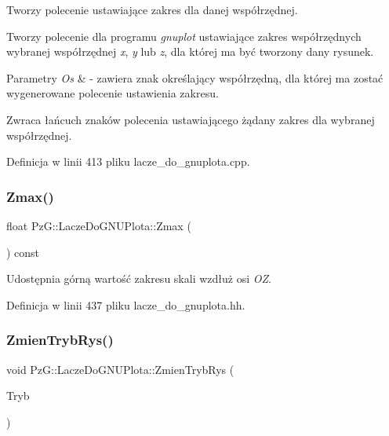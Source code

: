Tworzy polecenie ustawiające zakres dla danej współrzędnej. 

Tworzy polecenie dla programu {\itshape gnuplot} ustawiające zakres współrzędnych wybranej współrzędnej {\itshape x}, {\itshape y} lub {\itshape z}, dla której ma być tworzony dany rysunek. 
\begin{DoxyParams}{Parametry}
{\em Os} & -\/ zawiera znak określający współrzędną, dla której ma zostać wygenerowane polecenie ustawienia zakresu. \\
\hline
\end{DoxyParams}
\begin{DoxyReturn}{Zwraca}
łańcuch znaków polecenia ustawiającego żądany zakres dla wybranej współrzędnej. 
\end{DoxyReturn}


Definicja w linii 413 pliku lacze\+\_\+do\+\_\+gnuplota.\+cpp.

\mbox{\label{class_pz_g_1_1_lacze_do_g_n_u_plota_a20a5d03e1fc19c682032bffc54340f12}} 
\subsubsection{\texorpdfstring{Zmax()}{Zmax()}}
{\footnotesize\ttfamily float Pz\+G\+::\+Lacze\+Do\+G\+N\+U\+Plota\+::\+Zmax (\begin{DoxyParamCaption}{ }\end{DoxyParamCaption}) const\hspace{0.3cm}{\ttfamily [inline]}}

Udostępnia górną wartość zakresu skali wzdłuż osi {\itshape OZ}. 

Definicja w linii 437 pliku lacze\+\_\+do\+\_\+gnuplota.\+hh.

\mbox{\label{class_pz_g_1_1_lacze_do_g_n_u_plota_a10950349b348fd3a3d4143e95337527c}} 
\subsubsection{\texorpdfstring{Zmien\+Tryb\+Rys()}{ZmienTrybRys()}}
{\footnotesize\ttfamily void Pz\+G\+::\+Lacze\+Do\+G\+N\+U\+Plota\+::\+Zmien\+Tryb\+Rys (\begin{DoxyParamCaption}\item[{\hyperlink{namespace_pz_g_aeedae1ef10c66d720f9e89de408ca4ca}{Tryb\+Rysowania}}]{Tryb }\end{DoxyParamCaption})\hspace{0.3cm}{\ttfamily [inline]}}



